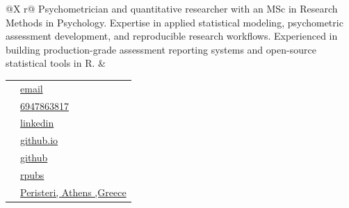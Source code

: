 \documentclass[
]{article}
\author{}
\date{\vspace{-2.5em}}
\begin{document}


\thispagestyle{empty}

\begin{tcolorbox}[sectionbox, title=Dimitrios Zacharatos]
\begin{tabularx}{\linewidth}{@{}X r@{}}
\small Psychometrician and quantitative researcher with an MSc in Research Methods in Psychology. Expertise in applied statistical modeling, psychometric assessment development, and reproducible research workflows. Experienced in building production-grade assessment reporting systems and open-source statistical tools in R. &
\begin{tabular}[t]{@{}c@{\,}l@{}}
  \textcolor{accent}{\faEnvelope} & \href{mailto:dzacharatos@yahoo.com}{\small email}\\
  \textcolor{accent}{\faPhone} & \href{tel:00306947863817}{\small 6947863817}\\
  \textcolor{accent}{\faLinkedin} & \href{https://www.linkedin.com/in/dimitrios-zacharatos/}{\small linkedin}\\
  \textcolor{accent}{\faHome} & \href{https://sedzinfo.github.io/}{\small github.io}\\
  \textcolor{accent}{\faGithub} & \href{https://github.com/sedzinfo}{\small github}\\
  \textcolor{accent}{\faGlobe} & \href{https://rpubs.com/sedzinfo}{\small rpubs}\\
  \textcolor{accent}{\faMapMarker} & \href{Peristeri, Athens ,Greece}{\small Peristeri, Athens ,Greece}\\
\end{tabular}
\end{tabularx}
\end{tcolorbox}
\end{document}
